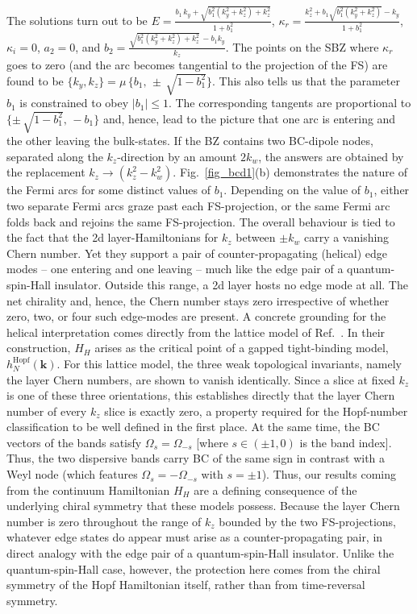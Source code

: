 \documentclass[aps,prb,onecolumn, footinbib, 10pt]{revtex4-2}
\begin{document}
The solutions turn out to be
$E = \frac{ b_1 \,k_y + \sqrt{b_1^2 \left(k_y^2+k_z^2\right)+k_z^2}} { 1 + b_1^2  }$,
$\kappa_r = \frac{ k_z^2 + b_1 \sqrt{b_1^2 \left(k_y^2+k_z^2\right) }-k_y}{ 1 + b_1^2}$, $\kappa_i  = 0 $,
$a_2 = 0 $, and $b_2  =  \frac{\sqrt{b_1^2 \left(k_y^2+k_z^2\right)+k_z^2}\,-b_1 k_y}{k_z}$. The points on the SBZ where $\kappa_r$ goes to zero (and the arc becomes tangential to the projection of the FS) are found to be $\lbrace k_y, k_z \rbrace = \mu \,\lbrace b_1 , \, \pm\, \sqrt{1-b_1^2}\rbrace $. This also tells us that the parameter $b_1$ is constrained to obey $|b_1|\leq 1 $. 
The corresponding tangents are proportional to $ \lbrace \pm\,\sqrt{1-b_1^2} , \, -b_1\rbrace $ and, hence, lead to the picture that one arc is entering and the other leaving the bulk-states. 
If the BZ contains two BC-dipole nodes, separated along the $ k_z$-direction by an amount $2k_w$, the answers are obtained by the replacement $ k_z \rightarrow (k_z^2 - k_w^2)$. 
Fig.~\ref{fig_bcd1}(b) demonstrates the nature of the Fermi arcs for some distinct values of $b_1$. Depending on the value of $b_1$, either two separate Fermi arcs graze past each FS-projection, or the same Fermi arc folds back and rejoins the same FS-projection. The overall behaviour is tied to the fact that the 2d layer-Hamiltonians for $k_z$ between $\pm k_w $ carry a vanishing Chern number. Yet they support a pair of counter-propagating (helical) edge modes -- one entering and one leaving -- much like the edge pair of a quantum-spin-Hall insulator. Outside this range, a 2d layer hosts no edge mode at all. The net chirality and, hence, the Chern number stays zero irrespective of whether zero, two, or four such edge-modes are present. A concrete grounding for the helical interpretation comes directly from the lattice model of Ref.~\cite{graf-hopf}. In their construction, $H_H$ arises as the critical point of a gapped tight-binding model, $h_N^{\text{Hopf}}(\mathbf{k})$. For this lattice model, the three weak topological invariants, namely the layer Chern numbers, are shown to vanish identically. Since a slice at fixed $k_z$ is one of these three orientations, this establishes directly that the layer Chern number of every $k_z$ slice is exactly zero, a property required for the Hopf-number classification to be well defined in the first place. At the same time, the BC vectors of the bands satisfy $\Omega_s = \Omega_{-s}$ [where $s \in (\pm 1, 0)$ is the band index]. Thus, the two dispersive bands carry BC of the same sign in contrast with a Weyl node (which features $\Omega_s = -\Omega_{-s}$ with $s=\pm 1$). Thus, our results coming from the continuum Hamiltonian $H_H$ are a defining consequence of the underlying chiral symmetry that these models possess. Because the layer Chern number is zero throughout the range of $k_z$ bounded by the two FS-projections, whatever edge states do appear must arise as a counter-propagating pair, in direct analogy with the edge pair of a quantum-spin-Hall insulator. Unlike the quantum-spin-Hall case, however, the protection here comes from the chiral symmetry of the Hopf Hamiltonian itself, rather than from time-reversal symmetry.
\end{document}
